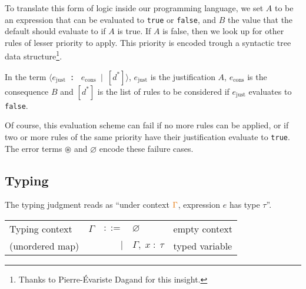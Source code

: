 \documentclass[11pt,a4paper]{article}
\newcommand{\synvar}[1]{\ensuremath{#1}}
\newcommand{\synkeyword}[1]{\textcolor{red!60!black}{\texttt{#1}}}
\newcommand{\synpunct}[1]{\textcolor{black!40!white}{\texttt{#1}}}
\newcommand{\synjust}{~\synpunct{:\raisebox{-0.9pt}{-}}~}
\newcommand{\syntrue}{\synkeyword{true}}
\newcommand{\synfalse}{\synkeyword{false}}
\newcommand{\synlangle}{\synpunct{$\langle$}}
\newcommand{\synrangle}{\synpunct{$\rangle$}}
\newcommand{\synmid}{\synpunct{~$|$~}}
\newcommand{\synemptydefault}{\synvar{\varnothing}}
\newcommand{\synerror}{\synvar{\circledast}}
\newcommand{\syndef}{$ ::= $}
\newcommand{\synalt}{\;$|$\;}
\newcommand{\typctx}[1]{\textcolor{orange!90!black}{\ensuremath{#1}}}
\newcommand{\typempty}{\typctx{\varnothing}}
\newcommand{\typcomma}{\typctx{,\;}}
\newcommand{\typvdash}{\typctx{\;\vdash\;}}
\newcommand{\typcolon}{\typctx{\;:\;}}
\begin{document}
To translate this form of logic inside our programming language, we set $A$ to 
be an expression that can be evaluated to \syntrue{} or \synfalse{}, and $B$
the value that the default should evaluate to if $A$ is true. If $A$ is false,
then we look up for other rules of lesser priority to apply. This priority 
is encoded trough a syntactic tree data structure\footnote{Thanks to Pierre-Évariste Dagand for this insight.}. 

In the term \synlangle\synvar{e_{\text{just}}}\synjust
\synvar{e_{\text{cons}}}\synmid $[\synvar{d}^*]$\synrangle, \synvar{e_{\text{just}}} 
is the justification $A$, \synvar{e_{\text{cons}}} is the consequence $B$ and 
$[\synvar{d}^*]$ is the list of rules to be considered if \synvar{e_{\text{just}}} 
evaluates to \synfalse{}. 
 
Of course, this evaluation scheme can fail if no more 
rules can be applied, or if two or more rules of the same priority have their 
justification evaluate to \syntrue{}. The error terms \synerror{} and \synemptydefault{}
encode these failure cases.

\subsection{Typing}
\label{sec:defaultcalc:typing}

The typing judgment \fbox{$\typctx{\Gamma}\typvdash\synvar{e}\typcolon\synvar{\tau}$} reads as
\enquote{under context $\typctx{\Gamma}$, expression $\synvar{e}$ has type $\synvar{\tau}$}.

\begin{center}
  \begin{tabular}{lrrll}
    Typing context&\typctx{\Gamma}&\syndef&\typempty&empty context\\
    (unordered map)&&\synalt&\typctx{\Gamma}\typcomma\synvar{x}\typcolon\synvar{\tau}&typed variable\\
  \end{tabular}
\end{center}
\end{document}
